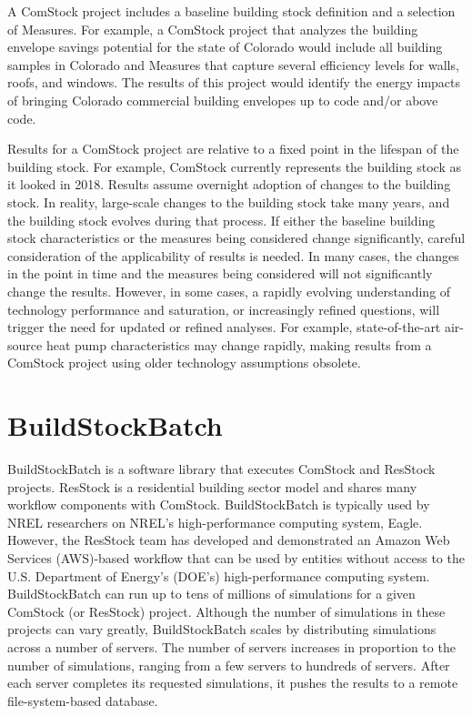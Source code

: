 A ComStock project includes a baseline building stock definition and a selection of Measures. For example, a ComStock project that analyzes the building envelope savings potential for the state of Colorado would include all building samples in Colorado and Measures that capture several efficiency levels for walls, roofs, and windows. The results of this project would identify the energy impacts of bringing Colorado commercial building envelopes up to code and/or above code.

Results for a ComStock project are relative to a fixed point in the lifespan of the building stock. For example, ComStock currently represents the building stock as it looked in 2018. Results assume overnight adoption of changes to the building stock. In reality, large-scale changes to the building stock take many years, and the building stock evolves during that process. If either the baseline building stock characteristics or the measures being considered change significantly, careful consideration of the applicability of results is needed. In many cases, the changes in the point in time and the measures being considered will not significantly change the results. However, in some cases, a rapidly evolving understanding of technology performance and saturation, or increasingly refined questions, will trigger the need for updated or refined analyses. For example, state-of-the-art air-source heat pump characteristics may change rapidly, making results from a ComStock project using older technology assumptions obsolete.

\section{BuildStockBatch}
\label{sec:buildstockbatch}

BuildStockBatch is a software library that executes ComStock and ResStock projects. ResStock is a residential building sector model and shares many workflow components with ComStock.  BuildStockBatch is typically used by NREL researchers on NREL's high-performance computing system, Eagle. However, the ResStock team has developed and demonstrated an Amazon Web Services (AWS)-based workflow that can be used by entities without access to the U.S. Department of Energy's (DOE's) high-performance computing system. BuildStockBatch can run up to tens of millions of simulations for a given ComStock (or ResStock) project. Although the number of simulations in these projects can vary greatly, BuildStockBatch scales by distributing simulations across a number of servers. The number of servers increases in proportion to the number of simulations, ranging from a few servers to hundreds of servers. After each server completes its requested simulations, it pushes the results to a remote file-system-based database.


